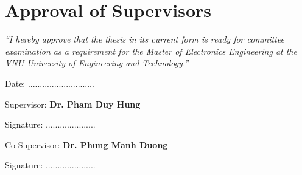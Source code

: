 \chapter*{Approval of Supervisors}

\textit{``I hereby approve that the thesis in its current form is ready for committee examination as a requirement for the Master of Electronics Engineering at the VNU University of Engineering and Technology.''}
\vspace{1cm}

\begin{flushleft}
    Date: ............................\quad\par

    Supervisor: \textbf{Dr. Pham Duy Hung}
    
    \vspace{0.5cm}
    Signature: .....................

    Co-Supervisor: \textbf{Dr. Phung Manh Duong}

    \vspace{0.5cm}
    Signature: .....................
\end{flushleft}
